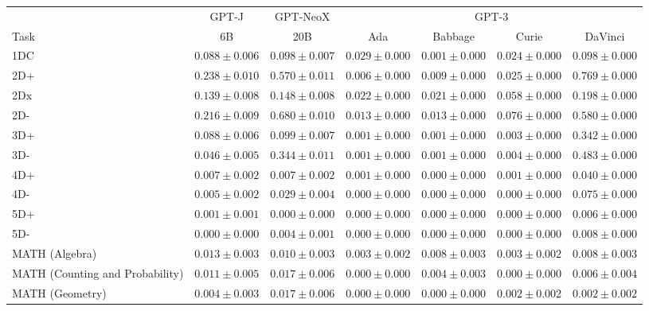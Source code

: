 \documentclass[11pt]{article}
\begin{document}
{\begin{landscape}
\begin{table}
\centering %
\begin{tabular}{l c c c c c c } \\ 
& GPT-J & GPT-NeoX & \multicolumn{4}{c}{GPT-3} \\
Task & 6B & 20B & Ada & Babbage & Curie & DaVinci \\ \toprule
1DC & $0.088 \pm 0.006$ & $0.098 \pm 0.007$ & $0.029 \pm 0.000$ & $0.001 \pm 0.000$ & $0.024 \pm 0.000$ & $0.098 \pm 0.000$ \\ 
2D+ & $0.238 \pm 0.010$ & $0.570 \pm 0.011$ & $0.006 \pm 0.000$ & $0.009 \pm 0.000$ & $0.025 \pm 0.000$ & $0.769 \pm 0.000$ \\ 
2Dx & $0.139 \pm 0.008$ & $0.148 \pm 0.008$ & $0.022 \pm 0.000$ & $0.021 \pm 0.000$ & $0.058 \pm 0.000$ & $0.198 \pm 0.000$ \\ 
2D- & $0.216 \pm 0.009$ & $0.680 \pm 0.010$ & $0.013 \pm 0.000$ & $0.013 \pm 0.000$ & $0.076 \pm 0.000$ & $0.580 \pm 0.000$ \\ 
3D+ & $0.088 \pm 0.006$ & $0.099 \pm 0.007$ & $0.001 \pm 0.000$ & $0.001 \pm 0.000$ & $0.003 \pm 0.000$ & $0.342 \pm 0.000$ \\ 
3D- & $0.046 \pm 0.005$ & $0.344 \pm 0.011$ & $0.001 \pm 0.000$ & $0.001 \pm 0.000$ & $0.004 \pm 0.000$ & $0.483 \pm 0.000$ \\ 
4D+ & $0.007 \pm 0.002$ & $0.007 \pm 0.002$ & $0.001 \pm 0.000$ & $0.000 \pm 0.000$ & $0.001 \pm 0.000$ & $0.040 \pm 0.000$ \\ 
4D- & $0.005 \pm 0.002$ & $0.029 \pm 0.004$ & $0.000 \pm 0.000$ & $0.000 \pm 0.000$ & $0.000 \pm 0.000$ & $0.075 \pm 0.000$ \\ 
5D+ & $0.001 \pm 0.001$ & $0.000 \pm 0.000$ & $0.000 \pm 0.000$ & $0.000 \pm 0.000$ & $0.000 \pm 0.000$ & $0.006 \pm 0.000$ \\ 
5D- & $0.000 \pm 0.000$ & $0.004 \pm 0.001$ & $0.000 \pm 0.000$ & $0.000 \pm 0.000$ & $0.000 \pm 0.000$ & $0.008 \pm 0.000$ \\ 
MATH (Algebra) & $0.013 \pm 0.003$ & $0.010 \pm 0.003$ & $0.003 \pm 0.002$ & $0.008 \pm 0.003$ & $0.003 \pm 0.002$ & $0.008 \pm 0.003$ \\ 
MATH (Counting and Probability) & $0.011 \pm 0.005$ & $0.017 \pm 0.006$ & $0.000 \pm 0.000$ & $0.004 \pm 0.003$ & $0.000 \pm 0.000$ & $0.006 \pm 0.004$ \\ 
MATH (Geometry) & $0.004 \pm 0.003$ & $0.017 \pm 0.006$ & $0.000 \pm 0.000$ & $0.000 \pm 0.000$ & $0.002 \pm 0.002$ & $0.002 \pm 0.002$ \\ 

\end{tabular}
\end{table}
\end{landscape}}
\end{document}
